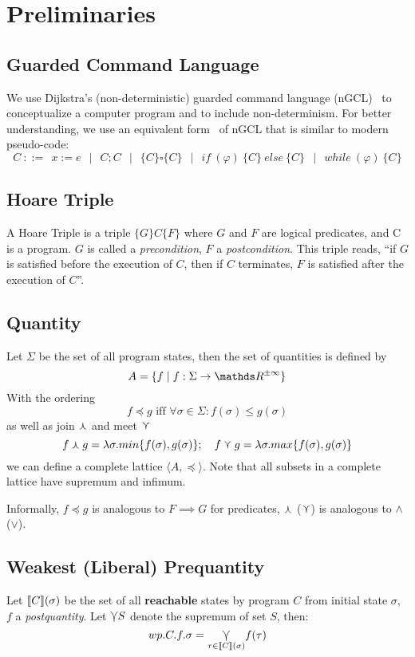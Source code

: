 \chapter{Preliminaries}\label{ch:Preliminaries}
\section{Guarded Command Language}
We use Dijkstra's (non-deterministic) guarded command language (nGCL)~\cite{Dijkstra1975} to conceptualize a computer program and to include non-determinism.
For better understanding, we use an equivalent form~\cite{Zhang2022} of nGCL that is similar to modern pseudo-code:
$$C\ ::=\ \  x:= e \ \ \mid\ \  C;C \ \ \mid\ \  \{C\}
 \square \{C\} \ \ \mid\ \
if\ (\varphi)\ \{C\}\ else\ \{C\} \ \ \mid\ \  while\ (\varphi)\ \{C\}$$

\section{Hoare Triple}
A Hoare Triple is a triple $ \{G\} C \{F\}$ where $G$ and $F$ are logical predicates, and C is a program.
$G$ is called a \textit{precondition}, $F$ a \textit{postcondition}.
This triple reads, ``if $G$ is satisfied before the execution of $C$, then if $C$ terminates, $F$ is satisfied after the execution of $C$''.

\section{Quantity}
Let $\Sigma$ be the set of all program states, then the set of quantities is defined by
\[A=\{f\mid f:\Sigma
\to
\Rinf
\}\]
With the ordering
\[f\preceq g \text{ iff } \forall \sigma \in \Sigma: f(\sigma)\leq g(\sigma)\]
as well as join $\curlywedge$ and meet $\curlyvee$
\[f\curlywedge g = \lambda \sigma.min\{f(\sigma), g(\sigma)\}; \ \ \  f\curlyvee g = \lambda \sigma.max\{f(\sigma), g(\sigma) \}\]
we can define a complete lattice $\langle A, \preceq\rangle$.
Note that all subsets in a complete lattice have supremum and infimum.

Informally, $f\preceq g$ is analogous to $F\implies G$ for predicates, $\curlywedge$ ($\curlyvee$) is analogous to $\wedge$ ($\vee$).

\section{Weakest (Liberal) Prequantity}
Let $\llbracket {C} \rrbracket
(\sigma)$ be the set of all
\textbf{reachable} states by program
$C$ from initial state $\sigma$, $f$ a \textit{postquantity}.
Let $\varcurlyvee S$ denote the supremum of set $S$, then:
\[wp.C.f.\sigma = \underset{\tau\in\llbracket {C} \rrbracket
(\sigma)}
{\varcurlyvee}
f(\tau)\]

